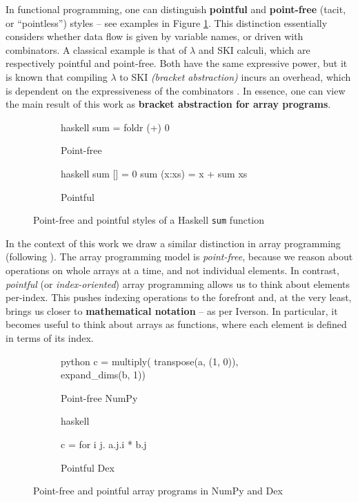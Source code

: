 In functional programming, one can distinguish \textbf{pointful} and \textbf{point-free} (tacit, or ``pointless'') styles -- see examples in Figure \ref{fig:point-haskell}. This distinction essentially considers whether data flow is given by variable names, or driven with combinators. A classical example is that of $\lambda$ and SKI calculi, which are respectively pointful and point-free. Both have the same expressive power, but it is known that compiling $\lambda$ to SKI \textit{(bracket abstraction)} incurs an overhead, which is dependent on the expressiveness of the combinators \cite{lachowski2018complexity}. 
In essence, one can view the main result of this work as \textbf{bracket abstraction for array programs}.

\begin{figure}[h]
\centering
\begin{subfigure}{.3\textwidth}
  \centering
    \begin{cminted}{haskell}
sum = foldr (+) 0
    \end{cminted}
      \caption{Point-free}
\end{subfigure}%
\begin{subfigure}{.3\textwidth}
  \centering
  \begin{cminted}{haskell}
sum [] = 0
sum (x:xs) = x + sum xs
  \end{cminted}
  \caption{Pointful}
\end{subfigure}
\caption{Point-free and pointful styles of a Haskell \texttt{sum} function}
\label{fig:point-haskell}
\end{figure}

In the context of this work we draw a similar distinction in array programming (following \textcite{paszke2021getting}).
The array programming model is \textit{point-free}, because we reason about operations on whole arrays at a time, and not individual elements. 
In contrast, \textit{pointful} (or \textit{index-oriented}) array programming allows us to think about elements per-index. 
This pushes indexing operations to the forefront and, at the very least, brings us closer to \textbf{mathematical notation} -- as per Iverson.
In particular, it becomes useful to think about arrays as functions, where each element is defined in terms of its index. 

\begin{figure}[h]
\centering
\begin{subfigure}{.4\textwidth}
  \centering
    \begin{cminted}{python}
c = multiply(
  transpose(a, (1, 0)),
  expand_dims(b, 1))
    \end{cminted}
      \caption{Point-free NumPy}
\end{subfigure}%
\begin{subfigure}{.4\textwidth}
  \centering
  \begin{cminted}{haskell}

c = for i j. a.j.i * b.j
  
  \end{cminted}
  \caption{Pointful Dex}
\end{subfigure}
\caption{Point-free and pointful array programs in NumPy and Dex}
\label{fig:point-arrays}
\end{figure}


